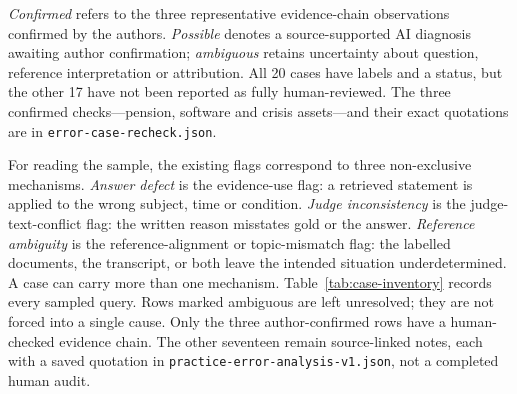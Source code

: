 \emph{Confirmed} refers to the three representative evidence-chain observations
confirmed by the authors. \emph{Possible} denotes a source-supported AI diagnosis
awaiting author confirmation; \emph{ambiguous} retains uncertainty about question,
reference interpretation or attribution.
All 20 cases have labels and a status, but the other 17 have not been reported
as fully human-reviewed. The three confirmed checks---pension, software and
crisis assets---and their exact quotations are in \texttt{error-case-recheck.json}.

For reading the sample, the existing flags correspond to three non-exclusive
mechanisms. \emph{Answer defect} is the evidence-use flag: a retrieved statement
is applied to the wrong subject, time or condition. \emph{Judge inconsistency}
is the judge-text-conflict flag: the written reason misstates gold or the answer.
\emph{Reference ambiguity} is the reference-alignment or topic-mismatch flag:
the labelled documents, the transcript, or both leave the intended situation
underdetermined. A case can carry more than one mechanism.
Table~\ref{tab:case-inventory} records every sampled query. Rows marked
ambiguous are left unresolved; they are not forced into a single cause.
Only the three author-confirmed rows have a human-checked evidence chain.
The other seventeen remain source-linked notes, each with a saved quotation in
\texttt{practice-error-analysis-v1.json}, not a completed human audit.

